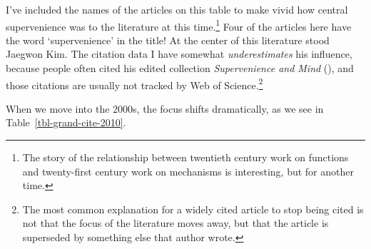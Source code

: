 \documentclass[
  12pt,
  letterpaper,
  DIV=11,
  numbers=noendperiod]{scrartcl}
\begin{document}
I've included the names of the articles on this table to make vivid how
central supervenience was to the literature at this time.\footnote{The
  story of the relationship between twentieth century work on functions
  and twenty-first century work on mechanisms is interesting, but for
  another time.} Four of the articles here have the word `supervenience'
in the title! At the center of this literature stood Jaegwon Kim. The
citation data I have somewhat \emph{underestimates} his influence,
because people often cited his edited collection \emph{Supervenience and
Mind} (), and
those citations are usually not tracked by Web of Science.\footnote{The
  most common explanation for a widely cited article to stop being cited
  is not that the focus of the literature moves away, but that the
  article is superseded by something else that author wrote.}

When we move into the 2000s, the focus shifts dramatically, as we see in
Table~\ref{tbl-grand-cite-2010}.
\end{document}
